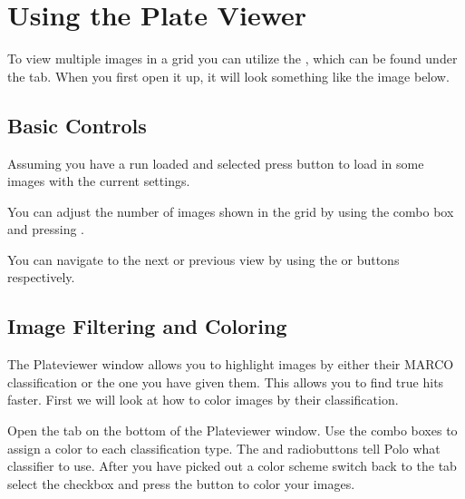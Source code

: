 \documentclass[letterpaper,10pt,english]{sphinxmanual}
\begin{document}
\section{Using the Plate Viewer}
\label{\detokenize{user_guide:using-the-plate-viewer}}
To view multiple images in a grid you can utilize the , which
can be found under the  tab. When you first open it up, it will
look something like the image below.
\begin{quote}

\noindent{}
\end{quote}


\subsection{Basic Controls}
\label{\detokenize{user_guide:basic-controls}}
Assuming you have a run loaded and selected press  button
to load in some images with the current settings.
\begin{quote}

\noindent{}
\end{quote}

You can adjust the number of images shown in the grid by using the
 combo box and pressing .
\begin{quote}

\noindent{}
\end{quote}

You can navigate to the next or previous view by using the  or
 buttons respectively.


\subsection{Image Filtering and Coloring}
\label{\detokenize{user_guide:image-filtering-and-coloring}}
The Plateviewer window allows you to highlight images by either their MARCO
classification or the one you have given them. This allows you to find true
hits faster. First we will look at how to color images by their classification.

Open the  tab on the bottom of the Plateviewer window.
Use the combo boxes to assign a color to each classification type. The
 and  radiobuttons tell Polo what classifier to use.
After you have picked out a color scheme switch back to the  tab
select the  checkbox and
press the  button to color your images.
\end{document}
